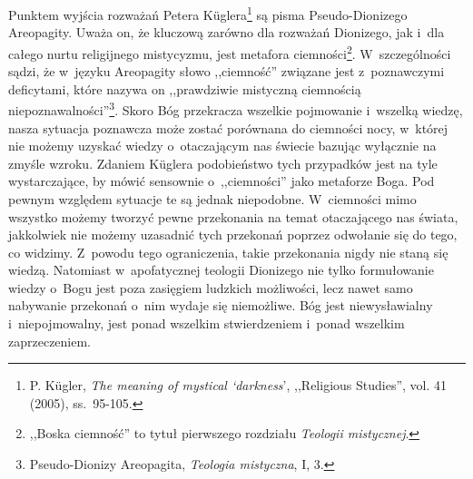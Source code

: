Punktem wyjścia rozważań Petera Küglera\footnote{P. Kügler, \textit{The meaning of mystical ‘darkness}', ,,Religious Studies'', vol. 41 (2005), ss.~95-105.} są pisma Pseudo-Dionizego Areopagity. Uważa on, że kluczową zarówno dla rozważań Dionizego, jak i~dla całego nurtu religijnego mistycyzmu, jest metafora ciemności\footnote{,,Boska ciemność'' to tytuł pierwszego rozdziału \textit{Teologii mistycznej}.}. W~szczególności sądzi, że w~języku Areopagity słowo ,,ciemność'' związane jest z~poznawczymi deficytami, które nazywa on ,,prawdziwie mistyczną ciemnością niepoznawalności''\footnote{Pseudo-Dionizy Areopagita, \textit{Teologia mistyczna}, I, 3.}. Skoro Bóg przekracza wszelkie pojmowanie i~wszelką wiedzę, nasza sytuacja poznawcza może zostać porównana do ciemności nocy, w~której nie możemy uzyskać wiedzy o~otaczającym nas świecie bazując wyłącznie na zmyśle wzroku. Zdaniem Küglera podobieństwo tych przypadków jest na tyle wystarczające, by mówić sensownie o~,,ciemności'' jako metaforze Boga. Pod pewnym względem sytuacje te są jednak niepodobne. W~ciemności mimo wszystko możemy tworzyć pewne przekonania na temat otaczającego nas świata, jakkolwiek nie możemy uzasadnić tych przekonań poprzez odwołanie się do tego, co widzimy. Z~powodu tego ograniczenia, takie przekonania nigdy nie staną się wiedzą. Natomiast w~apofatycznej teologii Dionizego nie tylko formułowanie wiedzy o~Bogu jest poza zasięgiem ludzkich możliwości, lecz nawet samo nabywanie przekonań o~nim wydaje się niemożliwe. Bóg jest niewysławialny i~niepojmowalny, jest ponad wszelkim stwierdzeniem i~ponad wszelkim zaprzeczeniem.

